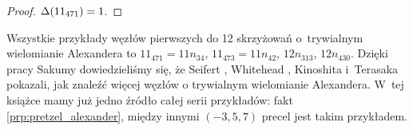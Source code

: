 \begin{proof}
    $\Delta(11_{471}) = 1$.
\end{proof}

Wszystkie przykłady węzłów pierwszych do 12 skrzyżowań o~trywialnym wielomianie Alexandera to $11_{471} = 11n_{34}$, $11_{473} = 11n_{42}$, $12n_{313}$, $12n_{430}$.
Dzięki pracy Sakumy \cite{sakuma20} dowiedzieliśmy się, że Seifert \cite{seifert35}, Whitehead \cite{whitehead37}, Kinoshita i~Terasaka \cite{kinoshita57} pokazali, jak znaleźć więcej węzłów o trywialnym wielomianie Alexandera.
%
%
%
%
%
W~tej książce mamy już jedno źródło całej serii przykładów: fakt \ref{prp:pretzel_alexander}, między innymi $(-3, 5, 7)$ precel jest takim przykładem.


